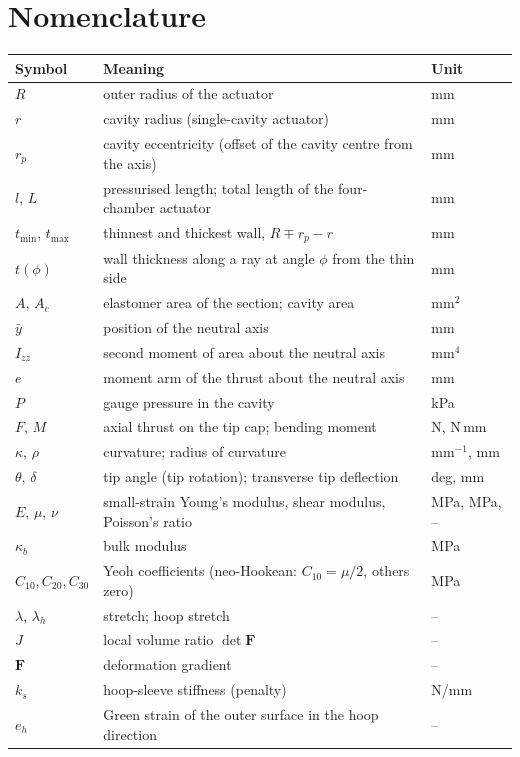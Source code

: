 \documentclass[12pt,a4paper,oneside]{report}
\numberwithin{equation}{chapter}
\numberwithin{figure}{chapter}
\numberwithin{table}{chapter}
\newcommand{\Izz}{I_{zz}}
\newcommand{\rp}{r_p}
\newcommand{\tmin}{t_{\min}}
\newcommand{\tmax}{t_{\max}}
\begin{document}
\chapter*{Nomenclature}
\begin{longtable}{@{}p{2.4cm}p{9.8cm}l@{}}
\toprule
Symbol & Meaning & Unit\\
\midrule
\endhead
$R$ & outer radius of the actuator & mm\\
$r$ & cavity radius (single-cavity actuator) & mm\\
$\rp$ & cavity eccentricity (offset of the cavity centre from the axis) & mm\\
$l$, $L$ & pressurised length; total length of the four-chamber actuator & mm\\
$\tmin$, $\tmax$ & thinnest and thickest wall, $R\mp\rp-r$ & mm\\
$t(\phi)$ & wall thickness along a ray at angle $\phi$ from the thin side & mm\\
$A$, $A_c$ & elastomer area of the section; cavity area & mm$^2$\\
$\bar y$ & position of the neutral axis & mm\\
$\Izz$ & second moment of area about the neutral axis & mm$^4$\\
$e$ & moment arm of the thrust about the neutral axis & mm\\
$P$ & gauge pressure in the cavity & kPa\\
$F$, $M$ & axial thrust on the tip cap; bending moment & N, N\,mm\\
$\kappa$, $\rho$ & curvature; radius of curvature & mm$^{-1}$, mm\\
$\theta$, $\delta$ & tip angle (tip rotation); transverse tip deflection & deg, mm\\
$E$, $\mu$, $\nu$ & small-strain Young's modulus, shear modulus, Poisson's ratio & MPa, MPa, --\\
$\kappa_b$ & bulk modulus & MPa\\
$C_{10},C_{20},C_{30}$ & Yeoh coefficients (neo-Hookean: $C_{10}=\mu/2$, others zero) & MPa\\
$\lambda$, $\lambda_h$ & stretch; hoop stretch & --\\
$J$ & local volume ratio $\det\bm F$ & --\\
$\bm F$ & deformation gradient & --\\
$k_s$ & hoop-sleeve stiffness (penalty) & N/mm\\
$e_h$ & Green strain of the outer surface in the hoop direction & --\\

\end{longtable}
\end{document}
